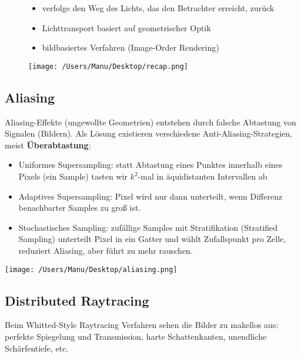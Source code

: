 \documentclass[paper=a4, fontsize=11pt]{scrartcl} %
\numberwithin{equation}{section} %
\numberwithin{figure}{section} %
\numberwithin{table}{section} %
\begin{document}
\begin{figure}[htbp]
\begin{minipage}[t]{10cm}
\vspace{0pt}
\begin{itemize}
\item verfolge den Weg des Lichts, das den Betrachter erreicht, zurück
\item Lichttransport basiert auf geometrischer Optik
\item bildbasiertes Verfahren (Image-Order Rendering)
\end{itemize}
\end{minipage}
\hfill
\begin{minipage}[t]{4cm}
\vspace{0pt}
\centering
\texttt{[image: /Users/Manu/Desktop/recap.png]}
\end{minipage}
\end{figure}

\subsection{Aliasing}

Aliasing-Effekte (ungewollte Geometrien) entstehen durch falsche Abtastung von Signalen (Bildern). Als Lösung existieren verschiedene Anti-Aliasing-Strategien, meist \textbf{Überabtastung}:
\begin{itemize}
\item Uniformes Supersampling: statt Abtastung eines Punktes innerhalb eines Pixels (ein Sample) tasten wir $k^2$-mal in äquidistanten Intervallen ab
\item Adaptives Supersampling: Pixel wird nur dann unterteilt, wenn Differenz benachbarter Samples zu groß ist.
\item Stochastisches Sampling: zufällige Samples mit Stratifikation (Stratified Sampling) unterteilt Pixel in ein Gatter und wählt Zufallspunkt pro Zelle, reduziert Aliasing, aber führt zu mehr rauschen.
\end{itemize}

\texttt{[image: /Users/Manu/Desktop/aliasing.png]}

\subsection{Distributed Raytracing}

Beim Whitted-Style Raytracing Verfahren sehen die Bilder zu makellos aus: perfekte Spiegelung und Transmission, harte Schattenkanten, unendliche Schärfentiefe, etc.
\newpage
\end{document}
